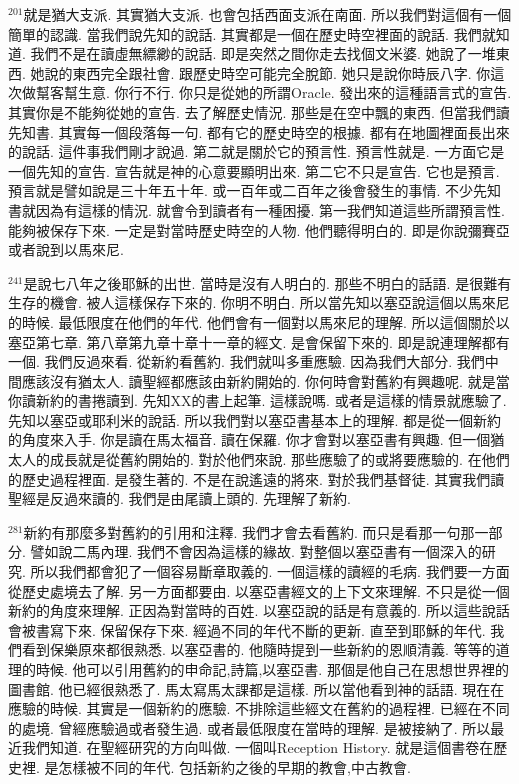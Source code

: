 \documentclass{book}
\begin{document}
$^{201}$就是猶大支派.
其實猶大支派.
也會包括西面支派在南面.
所以我們對這個有一個簡單的認識.
當我們說先知的說話.
其實都是一個在歷史時空裡面的說話.
我們就知道.
我們不是在讀虛無縹緲的說話.
即是突然之間你走去找個文米婆.
她說了一堆東西.
她說的東西完全跟社會.
跟歷史時空可能完全脫節.
她只是說你時辰八字.
你這次做幫客幫生意.
你行不行.
你只是從她的所謂Oracle.
發出來的這種語言式的宣告.
其實你是不能夠從她的宣告.
去了解歷史情況.
那些是在空中飄的東西.
但當我們讀先知書.
其實每一個段落每一句.
都有它的歷史時空的根據.
都有在地圖裡面長出來的說話.
這件事我們剛才說過.
第二就是關於它的預言性.
預言性就是.
一方面它是一個先知的宣告.
宣告就是神的心意要顯明出來.
第二它不只是宣告.
它也是預言.
預言就是譬如說是三十年五十年.
或一百年或二百年之後會發生的事情.
不少先知書就因為有這樣的情況.
就會令到讀者有一種困擾.
第一我們知道這些所謂預言性.
能夠被保存下來.
一定是對當時歷史時空的人物.
他們聽得明白的.
即是你說彌賽亞或者說到以馬來尼.

$^{241}$是說七八年之後耶穌的出世.
當時是沒有人明白的.
那些不明白的話語.
是很難有生存的機會.
被人這樣保存下來的.
你明不明白.
所以當先知以塞亞說這個以馬來尼的時候.
最低限度在他們的年代.
他們會有一個對以馬來尼的理解.
所以這個關於以塞亞第七章.
第八章第九章十章十一章的經文.
是會保留下來的.
即是說連理解都有一個.
我們反過來看.
從新約看舊約.
我們就叫多重應驗.
因為我們大部分.
我們中間應該沒有猶太人.
讀聖經都應該由新約開始的.
你何時會對舊約有興趣呢.
就是當你讀新約的書捲讀到.
先知XX的書上起筆.
這樣說嗎.
或者是這樣的情景就應驗了.
先知以塞亞或耶利米的說話.
所以我們對以塞亞書基本上的理解.
都是從一個新約的角度來入手.
你是讀在馬太福音.
讀在保羅.
你才會對以塞亞書有興趣.
但一個猶太人的成長就是從舊約開始的.
對於他們來說.
那些應驗了的或將要應驗的.
在他們的歷史過程裡面.
是發生著的.
不是在說遙遠的將來.
對於我們基督徒.
其實我們讀聖經是反過來讀的.
我們是由尾讀上頭的.
先理解了新約.

$^{281}$新約有那麼多對舊約的引用和注釋.
我們才會去看舊約.
而只是看那一句那一部分.
譬如說二馬內理.
我們不會因為這樣的緣故.
對整個以塞亞書有一個深入的研究.
所以我們都會犯了一個容易斷章取義的.
一個這樣的讀經的毛病.
我們要一方面從歷史處境去了解.
另一方面都要由.
以塞亞書經文的上下文來理解.
不只是從一個新約的角度來理解.
正因為對當時的百姓.
以塞亞說的話是有意義的.
所以這些說話會被書寫下來.
保留保存下來.
經過不同的年代不斷的更新.
直至到耶穌的年代.
我們看到保樂原來都很熟悉.
以塞亞書的.
他隨時提到一些新約的恩順清義.
等等的道理的時候.
他可以引用舊約的申命記,詩篇,以塞亞書.
那個是他自己在思想世界裡的圖書館.
他已經很熟悉了.
馬太寫馬太課都是這樣.
所以當他看到神的話語.
現在在應驗的時候.
其實是一個新約的應驗.
不排除這些經文在舊約的過程裡.
已經在不同的處境.
曾經應驗過或者發生過.
或者最低限度在當時的理解.
是被接納了.
所以最近我們知道.
在聖經研究的方向叫做.
一個叫Reception History.
就是這個書卷在歷史裡.
是怎樣被不同的年代.
包括新約之後的早期的教會,中古教會.
\end{document}
